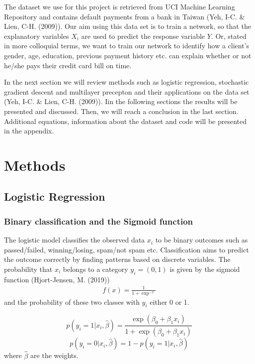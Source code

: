 \documentclass[11pt,english, A4]{article}
\begin{document}
The dataset we use for this project  is retrieved from UCI Machine Learning Repository and contains default payments from a bank in Taiwan (Yeh, I-C. \& Lien, C-H. (2009)). Our aim using this data set is to train a network, so that the explanatory variables $X_{i}$ are used to predict the response variable $Y$. Or, stated in more colloquial terms, we want to train our network to identify how a client's gender, age, education, previous payment history etc. can explain whether or not he/she pays their credit card bill on time. \

In the next section we will review methods such as logistic regression, stochastic gradient descent and multilayer precepton and their applications on the data set (Yeh, I-C. \& Lien, C-H. (2009)). Iin the following sections the results will 
be presented and discussed. Then, we will reach a conclusion in the last section. Additional equations, information about the dataset and code will be presented in the appendix. 






\newpage
\section{Methods}

\subsection{Logistic Regression}
\subsubsection{Binary classification and the Sigmoid function}
The logistic model classifies the observed data $x_i$ to be binary outcomes such as passed/failed, winning/losing, spam/not spam etc. Classification aims to predict the outcome correctly by finding patterns based on discrete variables. The probability that $x_i$ belongs to a category $y_i = (0,1)$ is given by the sigmoid function (Hjort-Jensen, M. (2019))
\begin{align}
f(x) = \frac{1}{1+\exp^{-x}}
\end{align}
and the probability of these two classes with $y_i$ either 0 or 1.

$$ p(y_{i} =1|x_i, \hat\beta) = \frac{\exp(\beta_{0} + \beta_{1}x_{i})}{1+\exp(\beta_{0} + \beta_{1}x_{i})}$$
$$ p(y_{i} =0|x_i, \hat\beta) = 1 - p(y_{i} =1|x_i, \hat\beta) $$
where $\hat\beta$ are the weights.
\end{document}
